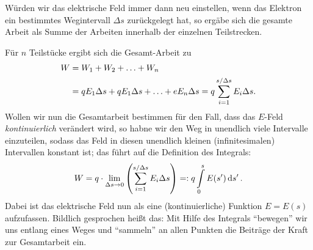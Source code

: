 Würden wir das elektrische Feld immer dann neu einstellen, wenn das Elektron ein bestimmtes Wegintervall $\Delta s$ zurückgelegt hat, so ergäbe sich die gesamte Arbeit als Summe der Arbeiten innerhalb der einzelnen Teilstrecken.
\begin{figure}[htp]
    \centering
\end{figure}
Für $n$ Teilstücke ergibt sich die Gesamt-Arbeit zu 
\begin{align}
    W &= W_1 + W_2 + \hdots + W_n \notag \\
      &= q E_1 \Delta s + q E_1 \Delta s + \hdots + e E_n \Delta s = q \sum_{i=1}^{s/\Delta s} E_i \Delta s.
\end{align}
Wollen wir nun die Gesamtarbeit bestimmen für den Fall, dass das $E$-Feld \emph{kontinuierlich} verändert wird, so habne wir den Weg in unendlich viele Intervalle einzuteilen, sodass das Feld in diesen unendlich kleinen (infinitesimalen) Intervallen konstant ist; das führt auf die Definition des Integrals: 
\begin{align}
    W = q \cdot \lim_{\Delta s \to 0} \qty(\sum_{i=1}^{s/\Delta s} E_i \Delta s) =: q\int\limits_{0}^{s} E(s') \dd{s'}.
\end{align}
Dabei ist das elektrische Feld nun als eine (kontinuierliche) Funktion $E = E(s)$ aufzufassen. Bildlich gesprochen heißt das: Mit Hilfe des Integrals ``bewegen'' wir uns entlang eines Weges und ``sammeln'' an allen Punkten die Beiträge der Kraft zur Gesamtarbeit ein. 
